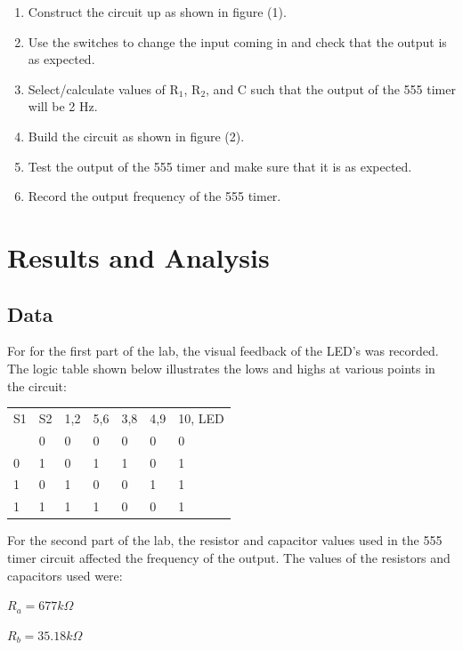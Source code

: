 \documentclass[twocolumn, amsmath]{revtex4}
\begin{document}
\begin{enumerate}
    \item Construct the circuit up as shown in figure (1). 
    \item Use the switches to change the input coming in and check that the output is as expected.
    \item Select/calculate values of R$_1$, R$_2$, and C such that the output of the 555 timer will be 2 Hz.
    \item Build the circuit as shown in figure (2).
    \item Test the output of the 555 timer and make sure that it is as expected.
    \item Record the output frequency of the 555 timer.
\end{enumerate}


\section{Results and Analysis}

\subsection{Data}
For for the first part of the lab, the visual feedback of the LED's was recorded. The logic table shown below illustrates the lows and highs at various points in the circuit:

\begin{center}
	\begin{ruledtabular}
    \begin{tabular}{ l l l l l l l}
	S1 & S2 & 1,2 & 5,6 & 3,8 & 4,9 & 10, LED \\ \colrule
	0 & 0 & 0 & 0 & 0 & 0 & 0  \\
	0 & 1 & 0 & 1 & 1 & 0 & 1 \\
	1 & 0 & 1 & 0 & 0 & 1 & 1  \\
	1 & 1 & 1 & 1 & 0 & 0 & 1 \\
\end{tabular}
    \end{ruledtabular}
\end{center}

For the second part of the lab, the resistor and capacitor values used in the 555 timer circuit affected the frequency of the output. The values of the resistors and capacitors used were:

\noindent $R_a = 677 k\Omega$

\noindent $R_b = 35.18 k\Omega$
\end{document}
